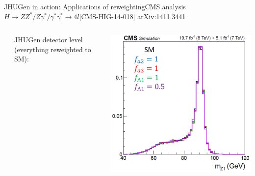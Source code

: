 \documentclass[usenames,dvipsnames,svgnames,table]{beamer}
\begin{document}
\begin{frame}{JHUGen in action: Applications of reweighting}{CMS analysis $H \to ZZ^*/Z\gamma^*/\gamma^*\gamma^* \to 4l$\hfill [CMS-HIG-14-018] arXiv:1411.3441}
\begin{columns}
\begin{column}{0.6\textwidth}
\begin{itemize}
\end{itemize}
\end{column}
\begin{column}{0.13\textwidth} \footnotesize
JHUGen detector level (everything reweighted to SM):
\end{column}
\begin{column}{0.27\textwidth}
\includegraphics[width=\textwidth]{HVV/reweighted}
\end{column}
\end{columns}
\end{frame}
\end{document}
